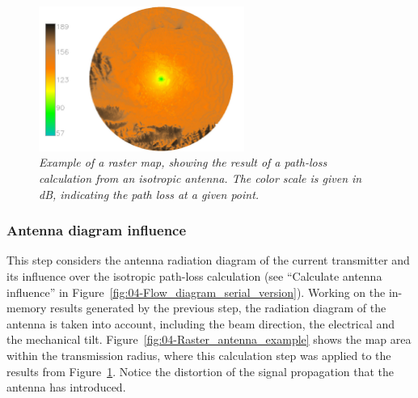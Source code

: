 \begin{figure}
\centering

\includegraphics[width=0.6\textwidth]{04-framework_design_and_implementation/img/isotrophic_calculation}

\caption{\textit{\emph{Example of a raster map, showing the result of a path-loss
calculation from an isotropic antenna. The color scale is given in
dB, indicating the path loss at a given point. \label{fig:04-Raster_path_loss_example}}}}
\end{figure}



\subsubsection{Antenna diagram influence \label{sub:04-Antenna_diagram_influence}}

This step considers the antenna radiation diagram of the current transmitter
and its influence over the isotropic path-loss calculation (see ``Calculate
antenna influence'' in Figure~\ref{fig:04-Flow_diagram_serial_version}).
Working on the in-memory results generated by the previous step, the
radiation diagram of the antenna is taken into account, including
the beam direction, the electrical and the mechanical tilt. Figure~\ref{fig:04-Raster_antenna_example}
shows the map area within the transmission radius, where this calculation
step was applied to the results from Figure~\ref{fig:04-Raster_path_loss_example}.
Notice the distortion of the signal propagation that the antenna has
introduced.

